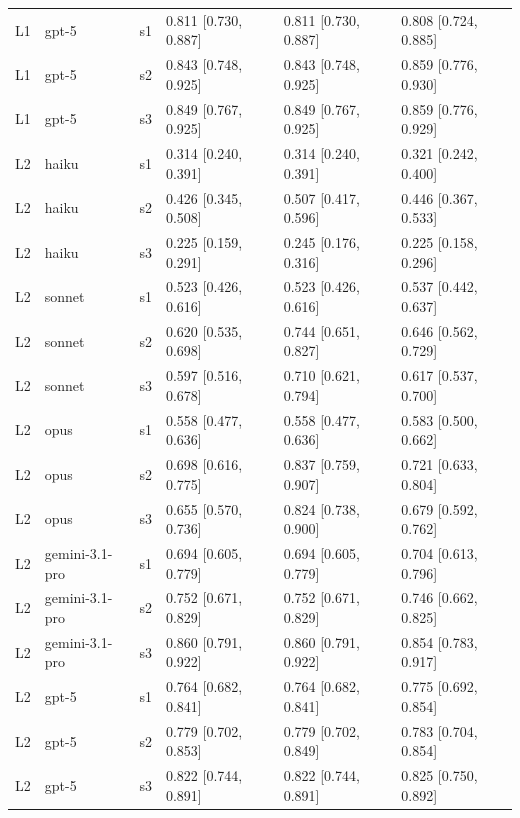\documentclass[10pt]{article} %
\begin{document}
\begin{table}[t]
\begin{center}
\begin{tabular}{llllll}
        L1 & gpt-5 & s1 & 0.811 [0.730, 0.887] & 0.811 [0.730, 0.887] & 0.808 [0.724, 0.885] \\
        L1 & gpt-5 & s2 & 0.843 [0.748, 0.925] & 0.843 [0.748, 0.925] & 0.859 [0.776, 0.930] \\
        L1 & gpt-5 & s3 & 0.849 [0.767, 0.925] & 0.849 [0.767, 0.925] & 0.859 [0.776, 0.929] \\
        L2 & haiku & s1 & 0.314 [0.240, 0.391] & 0.314 [0.240, 0.391] & 0.321 [0.242, 0.400] \\
        L2 & haiku & s2 & 0.426 [0.345, 0.508] & 0.507 [0.417, 0.596] & 0.446 [0.367, 0.533] \\
        L2 & haiku & s3 & 0.225 [0.159, 0.291] & 0.245 [0.176, 0.316] & 0.225 [0.158, 0.296] \\
        L2 & sonnet & s1 & 0.523 [0.426, 0.616] & 0.523 [0.426, 0.616] & 0.537 [0.442, 0.637] \\
        L2 & sonnet & s2 & 0.620 [0.535, 0.698] & 0.744 [0.651, 0.827] & 0.646 [0.562, 0.729] \\
        L2 & sonnet & s3 & 0.597 [0.516, 0.678] & 0.710 [0.621, 0.794] & 0.617 [0.537, 0.700] \\
        L2 & opus & s1 & 0.558 [0.477, 0.636] & 0.558 [0.477, 0.636] & 0.583 [0.500, 0.662] \\
        L2 & opus & s2 & 0.698 [0.616, 0.775] & 0.837 [0.759, 0.907] & 0.721 [0.633, 0.804] \\
        L2 & opus & s3 & 0.655 [0.570, 0.736] & 0.824 [0.738, 0.900] & 0.679 [0.592, 0.762] \\
        L2 & gemini-3.1-pro & s1 & 0.694 [0.605, 0.779] & 0.694 [0.605, 0.779] & 0.704 [0.613, 0.796] \\
        L2 & gemini-3.1-pro & s2 & 0.752 [0.671, 0.829] & 0.752 [0.671, 0.829] & 0.746 [0.662, 0.825] \\
        L2 & gemini-3.1-pro & s3 & 0.860 [0.791, 0.922] & 0.860 [0.791, 0.922] & 0.854 [0.783, 0.917] \\
        L2 & gpt-5 & s1 & 0.764 [0.682, 0.841] & 0.764 [0.682, 0.841] & 0.775 [0.692, 0.854] \\
        L2 & gpt-5 & s2 & 0.779 [0.702, 0.853] & 0.779 [0.702, 0.849] & 0.783 [0.704, 0.854] \\
        L2 & gpt-5 & s3 & 0.822 [0.744, 0.891] & 0.822 [0.744, 0.891] & 0.825 [0.750, 0.892] \\
    \end{tabular}
    \end{center}
    \end{table}
\end{document}
